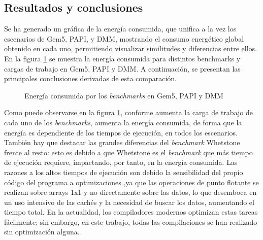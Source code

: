 \subsection{Resultados y conclusiones}

Se ha generado un gráfica de la energía consumida, que unifica a la vez los escenarios de Gem5, PAPI, y DMM, mostrando el consumo energético global obtenido en cada uno, permitiendo visualizar similitudes y diferencias entre ellos. En la figura \ref{fig:comparacionEnergia} se muestra la energía consumida para distintos benchmarks y cargas de trabajo en Gem5, PAPI y DMM. A continuación, se presentan las principales conclusiones derivadas de esta comparación.

\begin{figure}[H]
    \centering
    \caption{Energía consumida por los \textit{benchmarks} en Gem5, PAPI y DMM}
    \label{fig:comparacionEnergia}
\end{figure}

Como puede observarse en la figura \ref{fig:comparacionEnergia}, conforme aumenta la carga de trabajo de cada uno de los \textit{benchmarks}, aumenta la energía consumida, de forma que la energía es dependiente de los tiempos de ejecución, en todos los escenarios. También hay que destacar las grandes diferencias del \textit{benchmark} Whetstone frente al resto: esto es debido a que Whetstone es el \textit{benchmark} que más tiempo de ejecución requiere, impactando, por tanto, en la energía consumida. Las razones a los altos tiempos de ejecución son debido la sensibilidad del propio código del programa a optimizaciones \cite{referencia-tiempos-whetstone},ya que las operaciones de punto flotante se realizan sobre arrays 1x1 y no directamente sobre las datos, lo que desemboca en un uso intensivo de las cachés y la necesidad de buscar los datos, aumentando el tiempo total. En la actualidad, los compiladores modernos optimizan estas tareas fácilmente; sin embargo, en este trabajo, todas las compilaciones se han realizado sin optimización alguna. 

